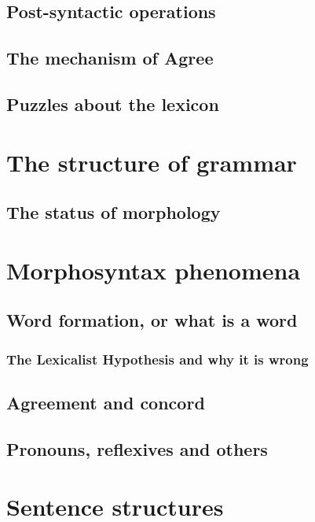 \documentclass[a4paper]{article}
\begin{document}
\subsection{Post-syntactic operations}\label{sec:post-syn-op}

\subsection{The mechanism of Agree}

\subsection{Puzzles about the lexicon}

\section{The structure of grammar}

\subsection{The status of morphology}

\section{Morphosyntax phenomena}

\subsection{Word formation, or what is a word}

\subsubsection{The Lexicalist Hypothesis and why it is wrong}

\subsection{Agreement and concord}

\subsection{Pronouns, reflexives and others}

\section{Sentence structures}
\end{document}
